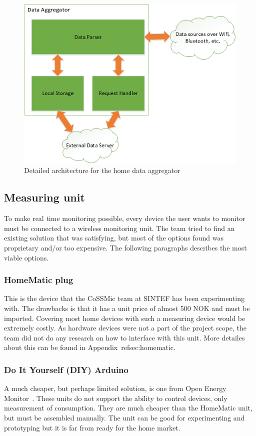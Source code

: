 \begin{figure}[H]
\centering
\includegraphics[width=\textwidth]{ch/further/fig/home.png}
\caption{Detailed architecture for the home data aggregator}
\label{fig:aggregator}
\end{figure}

\subsection{Measuring unit}
To make real time monitoring possible, every device the user wants to monitor must be connected to a wireless monitoring unit. The team tried to find an existing solution that was satisfying, but most of the options found was proprietary and/or too expensive. The following paragraphs describes the most viable options.

\subsubsection{HomeMatic plug}
This is the device that the CoSSMic team at SINTEF has been experimenting with. The drawbacks is that it has a unit price of almost 500 NOK and must be imported. Covering most home devices with such a measuring device would be extremely costly. As hardware devices were not a part of the project scope, the team did not do any research on how to interface with this unit. More detailes about this can be found in Appendix~ref{sec:homematic}.

\subsubsection{Do It Yourself (DIY) Arduino}
A much cheaper, but perhaps limited solution, is one from Open Energy Monitor~\cite{oemmodule}. These units do not support the ability to control devices, only measurement of consumption. They are much cheaper than the HomeMatic unit, but must be assembled manually. The unit can be good for experimenting and prototyping but it is far from ready for the home market.


